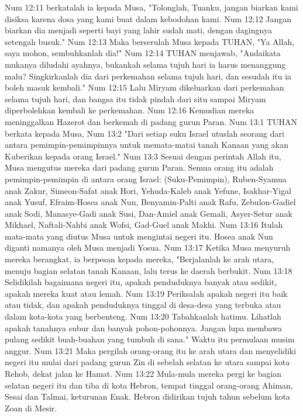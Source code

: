 Num 12:11  berkatalah ia kepada Musa, "Tolonglah, Tuanku, jangan biarkan kami disiksa karena dosa yang kami buat dalam kebodohan kami.
Num 12:12  Jangan biarkan dia menjadi seperti bayi yang lahir sudah mati, dengan dagingnya setengah busuk."
Num 12:13  Maka berserulah Musa kepada TUHAN, "Ya Allah, saya mohon, sembuhkanlah dia!"
Num 12:14  TUHAN menjawab, "Andaikata mukanya diludahi ayahnya, bukankah selama tujuh hari ia harus menanggung malu? Singkirkanlah dia dari perkemahan selama tujuh hari, dan sesudah itu ia boleh masuk kembali."
Num 12:15  Lalu Miryam dikeluarkan dari perkemahan selama tujuh hari, dan bangsa itu tidak pindah dari situ sampai Miryam diperbolehkan kembali ke perkemahan.
Num 12:16  Kemudian mereka meninggalkan Hazerot dan berkemah di padang gurun Paran.
Num 13:1  TUHAN berkata kepada Musa,
Num 13:2  "Dari setiap suku Israel utuslah seorang dari antara pemimpin-pemimpinnya untuk memata-matai tanah Kanaan yang akan Kuberikan kepada orang Israel."
Num 13:3  Sesuai dengan perintah Allah itu, Musa mengutus mereka dari padang gurun Paran. Semua orang itu adalah pemimpin-pemimpin di antara orang Israel: (Suku-Pemimpin), Ruben-Syamua anak Zakur, Simeon-Safat anak Hori, Yehuda-Kaleb anak Yefune, Isakhar-Yigal anak Yusuf, Efraim-Hosea anak Nun, Benyamin-Palti anak Rafu, Zebulon-Gadiel anak Sodi, Manasye-Gadi anak Susi, Dan-Amiel anak Gemali, Asyer-Setur anak Mikhael, Naftali-Nahbi anak Wofsi, Gad-Guel anak Makhi.
Num 13:16  Itulah mata-mata yang diutus Musa untuk mengintai negeri itu. Hosea anak Nun diganti namanya oleh Musa menjadi Yosua.
Num 13:17  Ketika Musa menyuruh mereka berangkat, ia berpesan kepada mereka, "Berjalanlah ke arah utara, menuju bagian selatan tanah Kanaan, lalu terus ke daerah berbukit.
Num 13:18  Selidikilah bagaimana negeri itu, apakah penduduknya banyak atau sedikit, apakah mereka kuat atau lemah.
Num 13:19  Periksalah apakah negeri itu baik atau tidak, dan apakah penduduknya tinggal di desa-desa yang terbuka atau dalam kota-kota yang berbenteng.
Num 13:20  Tabahkanlah hatimu. Lihatlah apakah tanahnya subur dan banyak pohon-pohonnya. Jangan lupa membawa pulang sedikit buah-buahan yang tumbuh di sana." Waktu itu permulaan musim anggur.
Num 13:21  Maka pergilah orang-orang itu ke arah utara dan menyelidiki negeri itu mulai dari padang gurun Zin di sebelah selatan ke utara sampai kota Rehob, dekat jalan ke Hamat.
Num 13:22  Mula-mula mereka pergi ke bagian selatan negeri itu dan tiba di kota Hebron, tempat tinggal orang-orang Ahiman, Sesai dan Talmai, keturunan Enak. Hebron didirikan tujuh tahun sebelum kota Zoan di Mesir.
